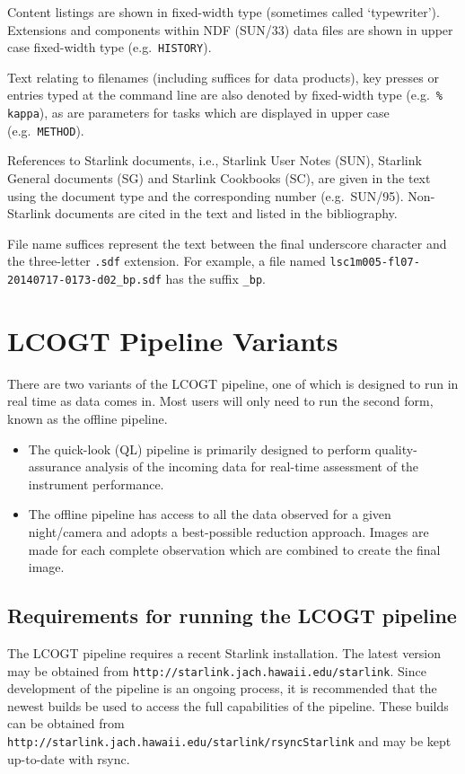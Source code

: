 \documentclass[twoside,11pt]{article}
\newcommand{\htmladdnormallink}[2]{#1}
\newcommand{\xref}[3]{#1}
\newcommand{\xlabel}[1]{}
\renewcommand{\_}{\texttt{\symbol{95}}}
\newcommand{\ndfref}{\xref{SUN/33}{sun33}{}}
\newcommand{\aparam}[1]{\texttt{#1}}     %
\newcommand{\ndfcomp}[1]{\texttt{#1}}    %
\begin{document}
Content listings are shown in fixed-width type (sometimes called
`typewriter'). Extensions and components within NDF (\ndfref) data
files are shown in upper case fixed-width type (e.g.\
\ndfcomp{HISTORY}).

Text relating to filenames (including suffices for data products), key
presses or entries typed at the command line are also denoted by
fixed-width type (e.g.\ \texttt{\% kappa}), as are parameters for
tasks which are displayed in upper case (e.g.\ \aparam{METHOD}).

References to Starlink documents, i.e., Starlink User Notes (SUN),
Starlink General documents (SG) and Starlink Cookbooks (SC), are given
in the text using the document type and the corresponding number
(e.g.\ SUN/95). Non-Starlink documents are cited in the text and
listed in the bibliography.

File name suffices represent the text between the final underscore
character and the three-letter \verb+.sdf+ extension. For example, a
file named \verb+lsc1m005-fl07-20140717-0173-d02_bp.sdf+ has the suffix
\verb+_bp+.

\section{\xlabel{pipelines}LCOGT Pipeline Variants\label{se:pipelines}}

There are two variants of the LCOGT pipeline, one of which is
designed to run in real time as data comes in. Most users will only need to
run the second form, known as the offline pipeline.

\begin{itemize}
\item The quick-look (QL) pipeline is primarily designed to perform
  quality-assurance analysis of the incoming data for real-time
  assessment of the instrument performance. 

\item The offline pipeline has access to all the data observed for a
  given night/camera and adopts a best-possible reduction approach. Images
  are made for each complete observation which are combined to create
  the final image.
\end{itemize}

\subsection{Requirements for running the LCOGT pipeline}

The LCOGT pipeline requires a recent Starlink installation. The
latest version may be obtained from
\htmladdnormallink{\texttt{http://starlink.jach.hawaii.edu/starlink}}{http://starlink.jach.hawaii.edu/starlink}. Since
development of the pipeline is an ongoing process, it is recommended
that the newest builds be used to access the full capabilities of the
pipeline. These builds can be obtained from\\
\htmladdnormallink{\texttt{http://starlink.jach.hawaii.edu/starlink/rsyncStarlink}}{http://starlink.jach.hawaii.edu/starlink/rsyncStarlink}
and may be kept up-to-date with rsync.
\end{document}
